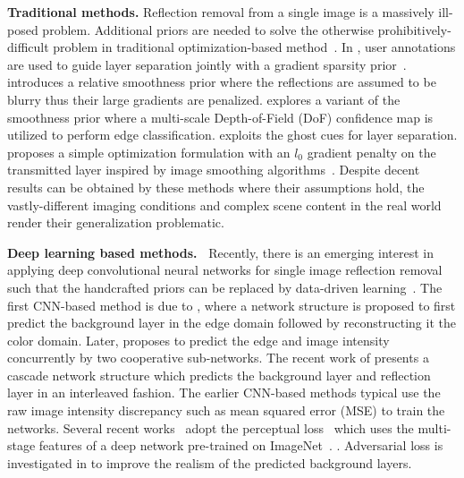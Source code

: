 \documentclass[10pt,twocolumn,letterpaper]{article}
\begin{document}
\vspace{5pt}
\noindent\textbf{Traditional methods.}
Reflection removal from a single image is a massively ill-posed problem. Additional priors are needed to solve the otherwise prohibitively-difficult problem in traditional optimization-based method~\cite{levin2007user,Li2014Single,wan2016depth,Arvanitopoulos_2017_CVPR,Wan2018Region}. In \cite{levin2007user}, user annotations are used to guide layer separation jointly with a gradient sparsity prior~\cite{levin2003learning}. \cite{Li2014Single} introduces a relative smoothness prior where the reflections are assumed to be blurry thus their large gradients are penalized. \cite{wan2016depth} explores a variant of the smoothness prior where a multi-scale Depth-of-Field (DoF) confidence map is utilized to perform edge classification. \cite{Shih_2015_CVPR} exploits the ghost cues for layer separation. \cite{Arvanitopoulos_2017_CVPR} proposes a simple optimization formulation with an $l_0$ gradient penalty on the transmitted layer inspired by image smoothing algorithms~\cite{L0smooth}.
Despite decent results can be obtained by these methods where their assumptions hold, the vastly-different imaging conditions and complex scene content in the real world render their generalization problematic. 


\vspace{5pt}
\noindent\textbf{Deep learning based methods.~}
Recently, there is an emerging interest in applying deep convolutional neural networks for single image reflection removal such that the handcrafted priors can be replaced by data-driven learning~\cite{fan2017generic,Wan_2018_CVPR,zhang2018single,eccv18refrmv}. The first CNN-based method is due to \cite{fan2017generic}, where a network structure is proposed to first predict the background layer in the edge domain followed by reconstructing it the color domain. Later, \cite{Wan_2018_CVPR} proposes to predict the edge and image intensity concurrently by two cooperative sub-networks. The recent work of \cite{eccv18refrmv} presents a cascade network structure which predicts the background layer and reflection layer in an interleaved fashion. The earlier CNN-based methods typical use the raw image intensity discrepancy such as mean squared error (MSE) to train the networks. Several recent works~\cite{zhang2018single,jin2018learning,chi2018single} adopt the perceptual loss~\cite{johnson2016perceptual} which uses the multi-stage features of a deep network pre-trained on ImageNet~\cite{russakovsky2015imagenet}.
\cite{zhang2018single}. Adversarial loss is investigated in \cite{zhang2018single,lee2018generative} to improve the realism of the predicted background layers.
\end{document}
